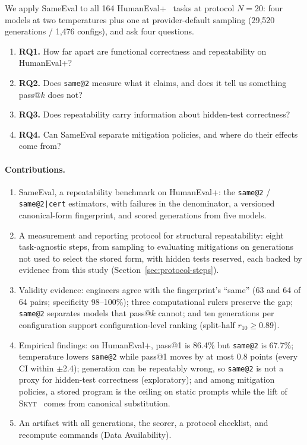 \documentclass[acmsmall,screen,review,anonymous]{acmart}
\makeatletter
\newcommand{\skyt}{\textsc{Skyt}}
\newcommand{\sameeval}{SameEval}
\newcommand{\sameat}{\mbox{\texttt{same@2}}}
\newcommand{\sameatc}{\mbox{\texttt{same@2|cert}}}
\makeatother
\begin{document}
We apply \sameeval{} to all 164 HumanEval+~\cite{liu2023evalplus} tasks at
protocol $N{=}20$: four models at two temperatures plus one at
provider-default sampling (29{,}520 generations / 1{,}476 configs), and ask
four questions.

\begin{enumerate}
  \item \textbf{RQ1.}
        How far apart are functional correctness and repeatability on
        HumanEval+?
  \item \textbf{RQ2.}
        Does \sameat{} measure what it claims, and does it tell us something
        pass@$k$ does not?
  \item \textbf{RQ3.}
        Does repeatability carry information about hidden-test correctness?
  \item \textbf{RQ4.}
        Can \sameeval{} separate mitigation policies, and where do their
        effects come from?
\end{enumerate}

\paragraph{Contributions.}
\begin{enumerate}
  \item \sameeval{}, a repeatability benchmark on HumanEval+: the \sameat{} /
        \sameatc{} estimators, with failures in the denominator, a versioned
        canonical-form fingerprint, and scored generations from five models.
  \item A measurement and reporting protocol for structural repeatability:
        eight task-agnostic steps, from sampling to evaluating mitigations
        on generations not used to select the stored form, with hidden tests
        reserved, each backed by
        evidence from this study (Section~\ref{sec:protocol-steps}).
  \item Validity evidence: engineers agree with the fingerprint's ``same''
        (63 and 64 of 64 pairs; specificity 98--100\%); three computational
        rulers preserve the gap; \sameat{} separates models that pass@$k$
        cannot; and ten generations per configuration support
        configuration-level ranking (split-half $r_{10}{\ge}0.89$).
  \item Empirical findings: on HumanEval+, pass@1 is 86.4\% but \sameat{}
        is 67.7\%; temperature lowers \sameat{} while pass@1 moves by at most
        0.8 points (every CI within $\pm$2.4); generation
        can be repeatably wrong, so \sameat{} is not a proxy for hidden-test
        correctness (exploratory); and among mitigation policies, a stored
        program is the ceiling on static prompts while the lift of
        \skyt{}~\cite{roriz2026skytmsr} comes from canonical substitution.
  \item An artifact with all generations, the scorer, a protocol checklist,
        and recompute commands (Data Availability).
\end{enumerate}
\end{document}
